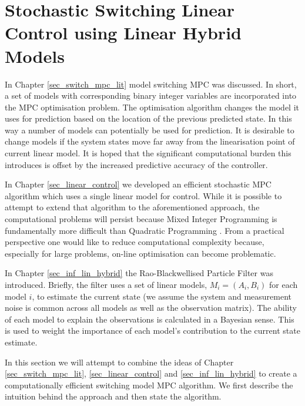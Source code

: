 \chapter{Stochastic Switching Linear Control using Linear Hybrid Models}
\label{sec_rbpf_control}
In Chapter \ref{sec_switch_mpc_lit} model switching MPC was discussed. In short, a set of models with corresponding binary integer variables are incorporated into the MPC optimisation problem. The optimisation algorithm changes the model it uses for prediction based on the location of the previous predicted state. In this way a number of models can potentially be used for prediction. It is desirable to change models if the system states move far away from the linearisation point of current linear model. It is hoped that the significant computational burden this introduces is offset by the increased predictive accuracy of the controller.

In Chapter \ref{sec_linear_control} we developed an efficient stochastic MPC algorithm which uses a single linear model for control. While it is possible to attempt to extend that algorithm to the aforementioned approach, the computational problems will persist because Mixed Integer Programming is fundamentally more difficult than Quadratic Programming \cite{forst}. From a practical perspective one would like to reduce computational complexity because, especially for large problems, on-line optimisation can become problematic.

In Chapter \ref{sec_inf_lin_hybrid} the Rao-Blackwellised Particle Filter was introduced. Briefly, the filter uses a set of linear models, $M_i=(A_i, B_i)$ for each model $i$, to estimate the current state (we assume the system and measurement noise is common across all models as well as the observation matrix). The ability of each model to explain the observations is calculated in a Bayesian sense. This is used to weight the importance of each model's contribution to the current state estimate. 

In this section we will attempt to combine the ideas of Chapter \ref{sec_switch_mpc_lit}, \ref{sec_linear_control} and \ref{sec_inf_lin_hybrid} to create a computationally efficient switching model MPC algorithm. We first describe the intuition behind the approach and then state the algorithm.

